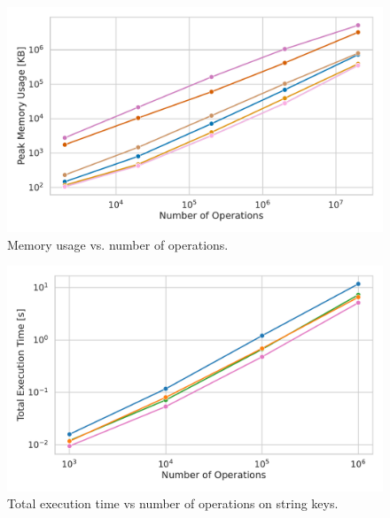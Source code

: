 \begin{figure}[H]
    \centering
    \includegraphics[width=1.0\textwidth]{figures/plots/plot_bulk_memory.pdf}
    \caption{Memory usage vs. number of operations.}
\end{figure}

\begin{figure}[H]
    \centering
    \includegraphics[width=1.0\textwidth]{figures/plots/plot_string_performance.pdf}
    \caption{Total execution time vs number of operations on string keys.}
\end{figure}

